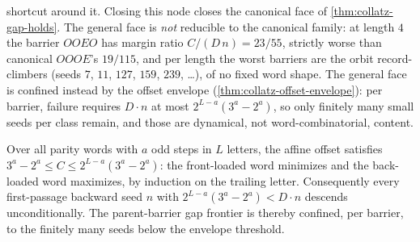 \begin{theorem}
  shortcut around it. Closing this node
  closes the canonical face of \cref{thm:collatz-gap-holds}. The general
  face is \emph{not} reducible to the canonical family: at length \(4\) the
  barrier \(OOEO\) has margin ratio \(C/(D\,n)=23/55\), strictly worse than
  canonical \(OOOE\)'s \(19/115\), and per length the worst barriers are the
  orbit record-climbers (seeds \(7\), \(11\), \(127\), \(159\), \(239\),
  \ldots), of no fixed word shape. The general face is confined instead by
  the offset envelope (\cref{thm:collatz-offset-envelope}): per barrier,
  failure requires \(D\cdot n\) at most \(2^{L-a}(3^a-2^a)\), so only
  finitely many small seeds per class remain, and those are dynamical, not
  word-combinatorial, content.
\end{theorem}

\begin{theorem}
  \label{thm:collatz-offset-envelope}
  \leanok
  Over all parity words with \(a\) odd steps in \(L\) letters, the affine
  offset satisfies \(3^a - 2^a \le C \le 2^{L-a}(3^a - 2^a)\): the
  front-loaded word minimizes and the back-loaded word maximizes, by
  induction on the trailing letter. Consequently every first-passage
  backward seed \(n\) with
  \(2^{L-a}(3^a-2^a) < D\cdot n\) descends unconditionally. The
  parent-barrier gap frontier is thereby confined, per barrier, to the
  finitely many seeds below the envelope threshold.
\end{theorem}
